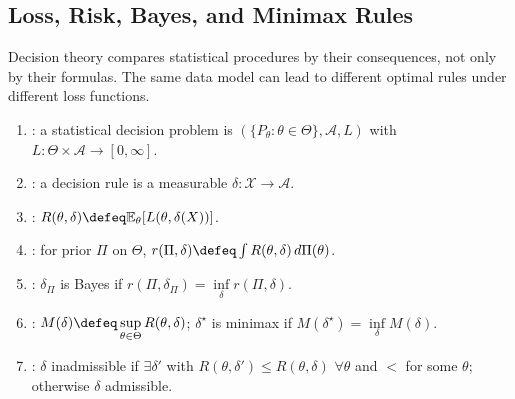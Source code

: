 \subsection{Loss, Risk, Bayes, and Minimax Rules}

Decision theory compares statistical procedures by their consequences, not only by their formulas.  The same data model can lead to different optimal rules under different loss functions.

\begin{definition} \label{def:statistical-decision-problem} \label{def:bayes-risk-minimax-admissible} 
\begin{enumerate}[label=(\roman*)]
\setlength{\itemsep}{0pt}
\item {}: a statistical decision problem is $(\{P_\theta:\theta\in\Theta\},\mathcal{A},L)$ with $L:\Theta\times\mathcal{A}\to[0,\infty]$.
\item {}: a decision rule is a measurable $\delta:\mathcal{X}\to\mathcal{A}$.
\item {}: $R(\theta,\delta)\defeq\mathbb{E}_\theta[L(\theta,\delta(X))]$.
\item {}: for prior $\Pi$ on $\Theta$, $r(\Pi,\delta)\defeq\int R(\theta,\delta)\,d\Pi(\theta)$.
\item {}: $\delta_\Pi$ is Bayes if $r(\Pi,\delta_\Pi)=\inf\limits_\delta r(\Pi,\delta)$.
\item {}: $M(\delta)\defeq\sup\limits_{\theta\in\Theta}R(\theta,\delta)$; $\delta^\star$ is minimax if $M(\delta^\star)=\inf\limits_\delta M(\delta)$.
\item {}: $\delta$ inadmissible if $\exists\delta'$ with $R(\theta,\delta')\leq R(\theta,\delta)$ $\forall \theta$ and $<$ for some $\theta$; otherwise $\delta$ admissible.
\end{enumerate}
\end{definition}

